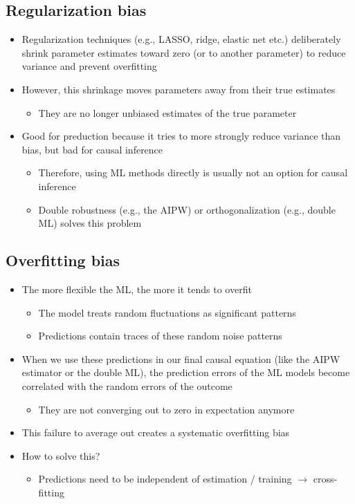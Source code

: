 \documentclass[10pt]{article}
\begin{document}
\subsection{Regularization bias}
\begin{itemize}
    \item Regularization techniques (e.g., LASSO, ridge, elastic net etc.) deliberately shrink parameter estimates toward zero (or to another parameter) to reduce variance and prevent overfitting 
    \item However, this shrinkage moves parameters away from their true estimates 
    \begin{itemize}
        \item They are no longer unbiased estimates of the true parameter 
    \end{itemize}
    \item Good for preduction because it tries to more strongly reduce variance than bias, but bad for causal inference 
    \begin{itemize}
        \item Therefore, using ML methods directly is usually not an option for causal inference 
        \item Double robustness (e.g., the AIPW) or orthogonalization (e.g., double ML) solves this problem 
    \end{itemize}
\end{itemize}
\subsection{Overfitting bias}
\begin{itemize}
    \item The more flexible the ML, the more it tends to overfit 
    \begin{itemize}
        \item The model treats random fluctuations as significant patterns 
        \item Predictions contain traces of these random noise patterns 
    \end{itemize}
    \item When we use these predictions in our final causal equation (like the AIPW estimator or the double ML), the prediction errors of the ML models become correlated with the random errors of the outcome 
    \begin{itemize}
        \item They are not converging out to zero in expectation anymore 
    \end{itemize}
    \item This failure to average out creates a systematic overfitting bias 
    \item How to solve this?
    \begin{itemize}
        \item Predictions need to be independent of estimation / training $\to $ cross-fitting 
    \end{itemize}
\end{itemize}
\end{document}
